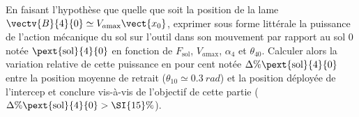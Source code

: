 \documentclass[11pt]{article}
\begin{document}
\begin{UPSTIcorrige}
%
%
% 
%
%



\end{UPSTIcorrige}



\UPSTIquestion  En faisant l’hypothèse que quelle que soit la position de la lame $\vectv{B}{4}{0} \simeq V_{a \text{max}} \vect{x_0}$, 
exprimer sous forme littérale la puissance de l’action mécanique du sol sur l’outil dans son mouvement par rapport au sol 0 notée $\pext{\text{sol}}{4}{0}$ en fonction de $F_{\text{sol}}$, 
$ V_{a \text{max}}$, $\alpha_4$ et $\theta_{40}$. 
Calculer alors la variation relative de cette puissance en pour cent notée $\Delta \% \pext{\text{sol}}{4}{0}$  entre la
position moyenne de retrait ($\theta_{10} \simeq \SI{0,3}{rad}$) et la position déployée de l’intercep et conclure
vis-à-vis de l’objectif de cette partie ($\Delta \% \pext{\text{sol}}{4}{0}>\SI{15}{\%}$).
\end{document}

